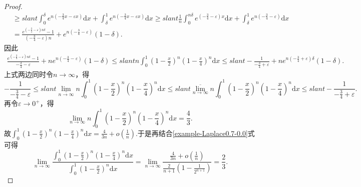 \documentclass[../../main.tex]{subfiles}
\begin{document}
\begin{proof}
\begin{align*}
&\geqslant slant \int_0^{\delta}{e^{n\left( -\frac{3}{4}x-\varepsilon x \right)}\mathrm{d}x}+\int_{\delta}^1{e^{n\left( -\frac{3}{4}x-\varepsilon x \right)}\mathrm{d}x}\geqslant slant \frac{1}{n}\int_0^{n\delta}{e^{\left( -\frac{3}{4}-\varepsilon \right) x}\mathrm{d}x}+\int_{\delta}^1{e^{n\left( -\frac{3}{4}-\varepsilon \right)}\mathrm{d}x}\\
&=\frac{e^{\left( -\frac{3}{4}-\varepsilon \right) n\delta}-1}{\left( -\frac{3}{4}-\varepsilon \right) n}+e^{n\left( -\frac{3}{4}-\varepsilon \right)}\left( 1-\delta \right) .
\end{align*}
因此
\begin{align*}
\frac{e^{\left( -\frac{3}{4}-\varepsilon \right) n\delta}-1}{-\frac{3}{4}-\varepsilon}+ne^{n\left( -\frac{3}{4}-\varepsilon \right)}\left( 1-\delta \right) \leqslant slant n\int_0^1{\left( 1-\frac{x}{2} \right) ^n\left( 1-\frac{x}{4} \right) ^n\mathrm{d}x}\leqslant slant -\frac{1}{-\frac{3}{4}+\varepsilon}+ne^{n\left( -\frac{3}{4}+\varepsilon \right) \delta}\left( 1-\delta \right) .
\end{align*}
上式两边同时令$n\rightarrow \infty$，得
\[
-\frac{1}{-\frac{3}{4}-\varepsilon}\leqslant slant \underset{n\rightarrow \infty}{\underline{\lim }}n\int_0^1{\left( 1-\frac{x}{2} \right) ^n\left( 1-\frac{x}{4} \right) ^n\mathrm{d}x}\leqslant slant \underset{n\rightarrow \infty}{\overline{\lim }}n\int_0^1{\left( 1-\frac{x}{2} \right) ^n\left( 1-\frac{x}{4} \right) ^n\mathrm{d}x}\leqslant slant -\frac{1}{-\frac{3}{4}+\varepsilon}.
\]
再令$\varepsilon \rightarrow 0^+$，得
\[
\lim\limits_{n\rightarrow \infty}n\int_0^1{\left( 1-\frac{x}{2} \right) ^n\left( 1-\frac{x}{4} \right) ^n\mathrm{d}x}=\frac{4}{3}.
\]
故$\int_0^1{\left( 1-\frac{x}{2} \right) ^n\left( 1-\frac{x}{4} \right) ^n\mathrm{d}x}=\frac{4}{3n}+o\left( \frac{1}{n} \right) .$于是再结合\eqref{example-Laplace0.7-0.0}式可得
\[
\lim_{n\rightarrow \infty} \frac{\int_0^1{\left( 1-\frac{x}{2} \right) ^n\left( 1-\frac{x}{4} \right) ^n\mathrm{d}x}}{\int_0^1{\left( 1-\frac{x}{2} \right) ^n\mathrm{d}x}}=\lim_{n\rightarrow \infty} \frac{\frac{4}{3n}+o\left( \frac{1}{n} \right)}{\frac{2}{n+1}\left( 1-\frac{1}{2^{n+1}} \right)}=\frac{2}{3}.
\]
\end{proof}
\end{document}
